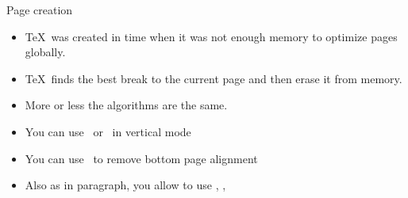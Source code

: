 \begin{frame}{Page creation}
    \begin{itemize}
        \item \TeX\ was created in time when it was not enough memory to optimize pages globally.
        \item \TeX\ finds the best break to the current page and then erase it from memory.
        \item More or less the algorithms are the same.
        \item You can use \ccol\penalty\ or \ccol\nobreak\ in vertical mode
        \item You can use \raggedbottom\ to remove bottom page alignment 
        \item Also as in paragraph, you allow to use \ccol\newpage, \ccol\pagebreak, \ccol\nopagebreak
         
    \end{itemize}
     
\end{frame}
